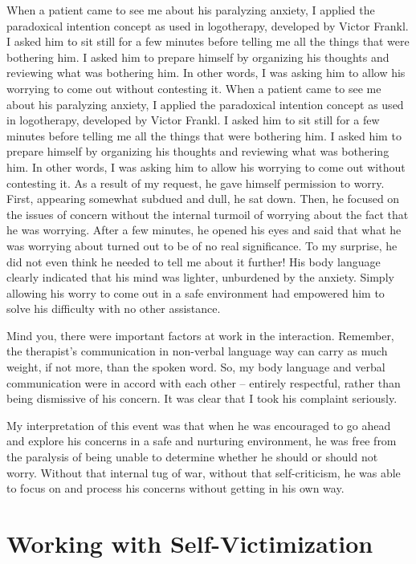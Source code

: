 \documentclass[]{book}
\begin{document}
When a patient came to see me about his paralyzing anxiety, I applied the paradoxical intention concept as used in logotherapy, developed by Victor Frankl. I asked him to sit still for a few minutes before telling me all the things that were bothering him. I asked him to prepare himself by organizing his thoughts and reviewing what was bothering him. In other words, I was asking him to allow his worrying to come out without contesting it.
When a patient came to see me about his paralyzing anxiety, I applied the paradoxical intention concept as used in logotherapy, developed by Victor Frankl. I asked him to sit still for a few minutes before telling me all the things that were bothering him. I asked him to prepare himself by organizing his thoughts and reviewing what was bothering him. In other words, I was asking him to allow his worrying to come out without contesting it.
As a result of my request, he gave himself permission to worry. First, appearing somewhat subdued and dull, he sat down. Then, he focused on the issues of concern without the internal turmoil of worrying about the fact that he was worrying. After a few minutes, he opened his eyes and said that what he was worrying about turned out to be of no real significance. To my surprise, he did not even think he needed to tell me about it further! His body language clearly indicated that his mind was lighter, unburdened by the anxiety. Simply allowing his worry to come out in a safe environment had empowered him to solve his difficulty with no other assistance.

Mind you, there were important factors at work in the interaction. Remember, the therapist's communication in non-verbal language way can carry as much weight, if not more, than the spoken word. So, my body language and verbal communication were in accord with each other -- entirely respectful, rather than being dismissive of his concern. It was clear that I took his complaint seriously.

My interpretation of this event was that when he was encouraged to go ahead and explore his concerns in a safe and nurturing environment, he was free from the paralysis of being unable to determine whether he should or should not worry. Without that internal tug of war, without that self-criticism, he was able to focus on and process his concerns without getting in his own way.

\hypertarget{working-with-self-victimization}{%
\section{Working with Self-Victimization}\label{working-with-self-victimization}}
\end{document}
